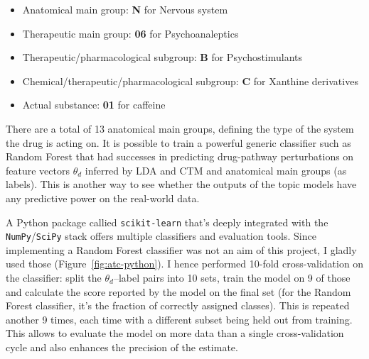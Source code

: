 \documentclass[12pt,a4paper,twoside,openright]{report}
\begin{document}
\begin{itemize}[noitemsep]
\item Anatomical main group: \textbf{N} for Nervous system
\item Therapeutic main group: \textbf{06} for Psychoanaleptics
\item Therapeutic/pharmacological subgroup: \textbf{B} for Psychostimulants
\item Chemical/therapeutic/pharmacological subgroup: \textbf{C} for Xanthine derivatives
\item Actual substance: \textbf{01} for caffeine
\end{itemize}

There are a total of 13 anatomical main groups, defining the type of the system the drug is acting on. It is possible to train a powerful generic classifier such as Random Forest\cite{Breiman:2001:RF:570181.570182} that had successes in predicting drug-pathway perturbations\cite{Riddick15012011} on feature vectors $\theta_d$ inferred by LDA and CTM and anatomical main groups (as labels). This is another way to see whether the outputs of the topic models have any predictive power on the real-world data.

A Python package callied \texttt{scikit-learn} \cite{scikit-learn} that's deeply integrated with the \texttt{NumPy}/\texttt{SciPy} stack offers multiple classifiers and evaluation tools. Since implementing a Random Forest classifier was not an aim of this project, I gladly used those (Figure~\ref{fig:atc-python}). I hence performed 10-fold cross-validation on the classifier: split the $\theta_d$--label pairs into 10 sets, train the model on 9 of those and calculate the score reported by the model on the final set (for the Random Forest classifier, it's the fraction of correctly assigned classes). This is repeated another 9 times, each time with a different subset being held out from training. This allows to evaluate the model on more data than a single cross-validation cycle and also enhances the precision of the estimate.
\end{document}
